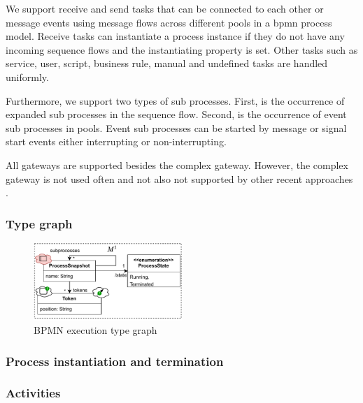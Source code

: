 \documentclass[adraft, copyright, creativecommons]{eptcs} %
\begin{document}
We support receive and send tasks that can be connected to each other or message events using message flows across different pools in a \gls*{bpmn} process model.
Receive tasks can instantiate a process instance if they do not have any incoming sequence flows and the \textsf{instantiating} property is set.
Other tasks such as service, user, script, business rule, manual and undefined tasks are handled uniformly.

Furthermore, we support two types of sub processes.
First, is the occurrence of expanded sub processes in the sequence flow.
Second, is the occurrence of event sub processes in pools.
Event sub processes can be started by message or signal start events either interrupting or non-interrupting.

All gateways are supported besides the complex gateway.
However, the complex gateway is not used often \cite{freundRealLifeBPMNUsing2019} and not also not supported by other recent approaches \cite{corradiniFormalApproachAnalysis2021, houhouFirstOrderLogicVerification2022, vangorpVisualTokenbasedFormalization2013}.

\subsubsection{Type graph}

\begin{figure}[h]
    \centering
    \includegraphics[width=0.5\textwidth]{images/bpmn_semantics-typegraph.pdf}
    \caption{BPMN execution type graph} %
    \label{fig:typeGraph}
\end{figure}

\subsubsection{Process instantiation and termination}

\subsubsection{Activities}
\end{document}

